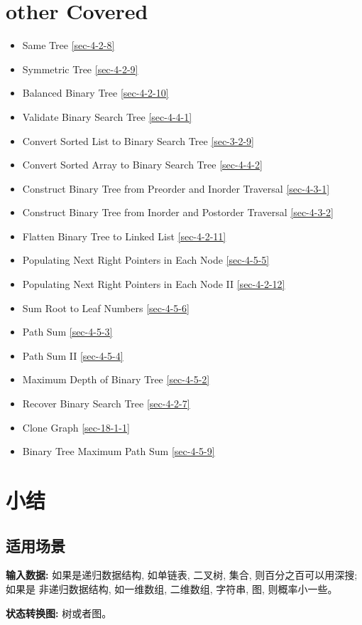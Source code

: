 \documentclass[12pt]{book}
\begin{document}
\section{other Covered}
\label{sec-11-3}
\begin{itemize}
\item Same Tree
\ref{sec-4-2-8}
\item Symmetric Tree
\ref{sec-4-2-9}
\item Balanced Binary Tree
\ref{sec-4-2-10}
\item Validate Binary Search Tree
\ref{sec-4-4-1}
\item Convert Sorted List to Binary Search Tree
\ref{sec-3-2-9}
\item Convert Sorted Array to Binary Search Tree
\ref{sec-4-4-2}
\item Construct Binary Tree from Preorder and Inorder Traversal
\ref{sec-4-3-1}
\item Construct Binary Tree from Inorder and Postorder Traversal
\ref{sec-4-3-2}
\item Flatten Binary Tree to Linked List
\ref{sec-4-2-11}
\item Populating Next Right Pointers in Each Node
\ref{sec-4-5-5}
\item Populating Next Right Pointers in Each Node II
\ref{sec-4-2-12}
\item Sum Root to Leaf Numbers        
\ref{sec-4-5-6}
\item Path Sum
\ref{sec-4-5-3}
\item Path Sum II
\ref{sec-4-5-4}
\item Maximum Depth of Binary Tree
\ref{sec-4-5-2}
\item Recover Binary Search Tree
\ref{sec-4-2-7}
\item Clone Graph
\ref{sec-18-1-1}
\item Binary Tree Maximum Path Sum
\ref{sec-4-5-9}
\end{itemize}
\section{小结}
\label{sec-11-4}
\subsection{适用场景}
\label{sec-11-4-1}
\textbf{输入数据:} 如果是递归数据结构, 如单链表, 二叉树, 集合, 则百分之百可以用深搜;如果是
非递归数据结构, 如一维数组, 二维数组, 字符串, 图, 则概率小一些。

\textbf{状态转换图:} 树或者图。
\end{document}
